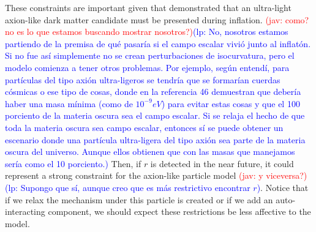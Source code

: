 \documentclass[amssymb,twocolumn,prd,nofootinbib,showpacs]{revtex4-1}
\newcommand{\jav}[1]{\textcolor{red}{(jav: #1)}}
\newcommand{\lp}[1]{\textcolor{blue}{(lp: #1)}}
\begin{document}
 These constraints are important given that \cite{laldm} demonstrated that an ultra-light axion-like dark matter candidate must be presented during inflation. \jav{como? no es lo que estamos buscando mostrar nosotros?}\lp{No,  nosotros  estamos  partiendo
de  la  premisa  de  qu\'e  pasar\'ia  si  el  campo  escalar  vivi\'o junto al inflat\'on.  Si no fue as\'i simplemente no se crean perturbaciones de isocurvatura, pero el modelo comienza a  tener  otros  problemas.   Por  ejemplo,  seg\'un  entend\'i, para part\'iculas del tipo axi\'on ultra-ligeros se tendr\'ia que se formar\'ian cuerdas c\'osmicas o ese tipo de cosas, donde en  la  referencia  46  demuestran  que  deber\'ia  haber  una masa m\'inima (como de $10^{−9}eV$) para evitar estas cosas y que el 100 porciento de la materia oscura sea el campo escalar.  Si se relaja el hecho de que toda la materia oscura sea campo escalar, entonces s\'i se puede obtener un escenario donde una part\'icula ultra-ligera del tipo axi\'on sea parte de la materia oscura del universo.  Aunque ellos obtienen que con las masas que manejamos ser\'ia como el 10 porciento.} Then, if $r$ is detected in the near future, it could represent a strong constraint for the axion-like particle model \jav{y viceversa?}\lp{Supongo que s\'i, aunque creo que es m\'as restrictivo encontrar $r$}. 
 Notice that if we relax the mechanism under this particle is created or if we add an 
 auto-interacting component, we should expect these restrictions be less affective to the model. 
\end{document}
